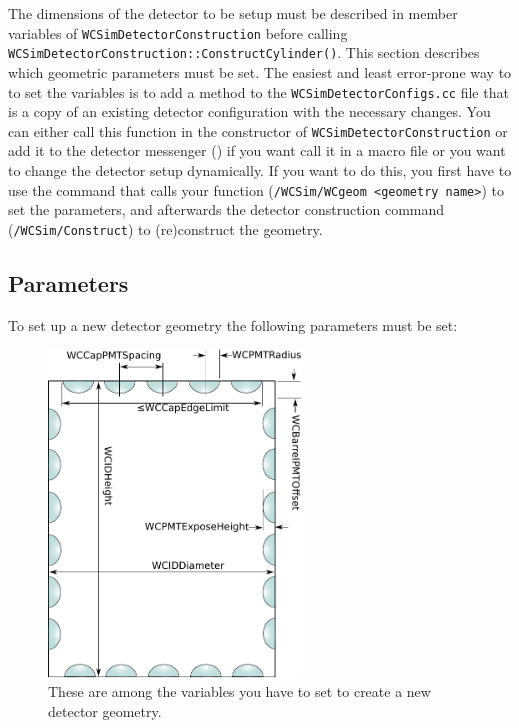 The dimensions of the detector to be setup must be described in member variables of  \texttt{WCSimDetectorConstruction} before calling  \texttt{WCSimDetectorConstruction::ConstructCylinder()}. This section describes which geometric parameters must be set. The easiest and least error-prone way to to set the variables is to add a method to the \texttt{WCSimDetectorConfigs.cc} file that is a copy of an existing detector configuration with the necessary changes.
You can either call this function in the constructor of \texttt{WCSimDetectorConstruction} or add it to the detector messenger () if you want call it in a macro file or you want to change the detector setup dynamically. If you want to do this, you first have to use the command that calls your function (\texttt{/WCSim/WCgeom <geometry name>}) to set the parameters, and afterwards the detector construction command (\texttt{/WCSim/Construct}) to (re)construct the geometry.

\subsection{Parameters}\label{sec:param}
To set up a new detector geometry the following parameters must be set:

\begin{figure}
  \begin{center}
\includegraphics[width=0.60\textwidth]{variables}
  \end{center}
\caption{These are among the variables you have to set to create a new detector geometry.}\label{fig:geom}
\end{figure}


